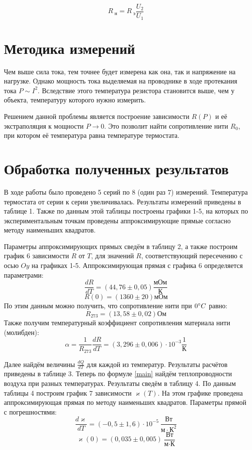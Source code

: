 \documentclass[15pt,a5paper,reqno]{article}
\renewcommand{\kappa}{\varkappa}
\begin{document}
    \begin{equation}
        R_{\text{ н}} = R_{\text{ э}}\frac{U_2}{U_1}
    \end{equation}
    
\section{Методика измерений}	

    Чем выше сила тока, тем точнее будет измерена как она, так и напряжение на нагрузке. Однако мощность тока выделяемая на проводнике в ходе протекания тока $P\sim I^2$. Вследствие этого температура резистора становится выше, чем у объекта, температуру которого нужно измерить.
    
    Решением данной проблемы является построение зависимости $R(P)$ и её экстраполяция к мощности $P\rightarrow 0$. Это позволит найти сопротивление нити $R_0$, при котором её температура равна температуре термостата.

\section{Обработка полученных результатов}

    В ходе работы было проведено 5 серий по 8 (один раз 7) измерений. Температура термостата от серии к серии увеличивалась. Результаты измерений приведены в таблице 1. Также по данным этой таблицы построены графики 1-5, на которых по экспериментальным точкам проведены аппроксимирующие прямые согласно методу наименьших квадратов.
    
    Параметры аппроксимирующих прямых сведём в таблицу 2, а также построим график 6 зависимости $R$ от $T$, для значений $R$, соответствующий пересечению с осью $Oy$ на графиках 1-5. Аппроксимирующая прямая с графика 6 определяется параметрами:
    \[\frac{dR}{dT} = (44,76 \pm 0,05) \frac{\text{мОм}}{\text{К}}\]
    \[R(0) = (1360 \pm 20) \text{мОм}\]
    По этим данным можно получить, что сопротивление нити при $0 \degree C$ равно:
    \[R_{273} = (13,58 \pm 0,02) \text{Ом}\]
    Также получим температурный коэффициент сопротивления материала нити (молибден):
    \[\alpha = \frac{1}{R_{273}}\frac{dR}{dT} = (3,296 \pm 0,006)\cdot 10^{-3}\frac{1}{\text{К}}\]
    
    Далее найдём величины $\frac{dQ}{dT}$ для каждой из температур. Результаты расчётов приведены в таблице 3. Теперь по формуле \eqref{main} найдём теплопроводности воздуха при разных температурах. Результаты сведём в таблицу 4. По данным таблицы 4 построим график 7 зависимости $\kappa(T)$. На этом графике проведена аппроксимирующая прямая по методу наименьших квадратов. Параметры прямой с погрешностями:
    \[\frac{d\kappa}{dT} = (-0,5 \pm 1,6)\cdot 10^{-5}\ \frac{\text{Вт}}{\text{м}\cdot\text{К}^2}\]
    \[\kappa(0) = (0,035 \pm 0,005)\ \frac{\text{Вт}}{\text{м}\cdot\text{К}}\]
\end{document}
